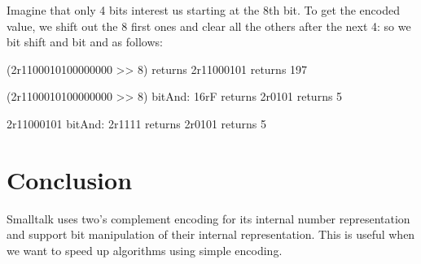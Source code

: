 \documentclass[a4paper,10pt,twoside]{book}
\begin{document}
Imagine that only 4 bits interest us starting at the 8th bit.
To get the encoded value, we shift out the 8 first ones and clear all the others after the next 4: so we bit shift and bit and as follows:

\begin{code}{}
(2r1100010100000000 >> 8)
	returns 2r11000101
	returns 197

(2r1100010100000000 >> 8) bitAnd: 16rF	
	returns 2r0101	
	returns 5
	
2r11000101 bitAnd: 2r1111
	returns 2r0101	
	returns 5
\end{code}

\section{Conclusion}

Smalltalk uses two's complement encoding for its internal number representation and support  bit manipulation of their internal representation. This is useful when we want to speed up algorithms using simple encoding.


\ifx\wholebook\relax\else
   
   
\end{document}
